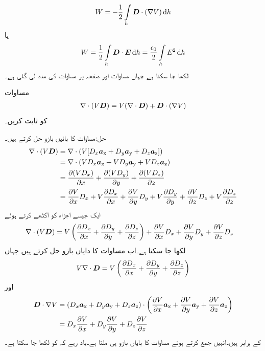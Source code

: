 \begin{align*}
W=-\frac{1}{2} \int \limits_h \kvec{D} \cdot (\nabla V) \dif h
\end{align*}
یا
\begin{align}\label{مساوات_توانائی_کثافت_توانائی_ب}
W=\frac{1}{2} \int \limits_h \kvec{D} \cdot \kvec{E} \dif h=\frac{\epsilon_0}{2}\int \limits_h  E^2 \dif h
\end{align}
لکھا جا سکتا ہے جہاں  مساوات  اور صفحہ  پر مساوات  کی مدد لی گئی ہے۔

مساوات 
\begin{align*}
\nabla \cdot  (V {{\boldsymbol{D}}})=V (\nabla \cdot {\ensuremath{{\boldsymbol{D}}}})+{{\boldsymbol{D}}} \cdot (\nabla V)
\end{align*}
 کو ثابت کریں۔

حل:مساوات  کا بائیں بازو حل کرتے ہیں۔
\begin{align*}
\nabla \cdot (V {{\boldsymbol{D}}})&=\nabla \cdot (V[D_x{\boldsymbol{a}}_{\textup{x}}+D_y{\boldsymbol{a}}_{\textup{y}}+D_z{\boldsymbol{a}}_{\textup{z}}])\\
&=\nabla \cdot (V D_x{\boldsymbol{a}}_{\textup{x}}+V D_y{\boldsymbol{a}}_{\textup{y}}+VD_z{\boldsymbol{a}}_{\textup{z}})\\
&=\frac{\partial (V D_x)}{\partial x}+\frac{\partial (V D_y)}{\partial y}+\frac{\partial (V D_z)}{\partial z}\\
&=\frac{\partial V}{\partial x} D_x +V\frac{\partial D_x}{\partial x}+\frac{\partial V}{\partial y} D_y +V\frac{\partial D_y}{\partial y}+\frac{\partial V}{\partial z} D_z +V\frac{\partial D_z}{\partial z}
\end{align*}
ایک جیسے اجزاء کو اکٹھے کرتے ہوئے
\begin{align*}
\nabla \cdot (V {{\boldsymbol{D}}})&=V\left(\frac{\partial D_x}{\partial x}+\frac{\partial D_y}{\partial y}+\frac{\partial D_z}{\partial z}\right)+\frac{\partial V}{\partial x} D_x +\frac{\partial V}{\partial y} D_y +\frac{\partial V}{\partial z} D_z 
\end{align*}
لکھا جا سکتا ہے۔اب مساوات  کا دایاں بازو حل کرتے ہیں جہاں 
\begin{align*}
V \nabla \cdot {\ensuremath{{\boldsymbol{D}}}}=V \left(\frac{\partial D_x}{\partial x}+\frac{\partial D_y}{\partial y}+\frac{\partial D_z}{\partial z} \right)
\end{align*}
اور
\begin{align*}
{\ensuremath{{\boldsymbol{D}}}} \cdot \nabla V&=(D_x{\boldsymbol{a}}_{\textup{x}}+D_y{\boldsymbol{a}}_{\textup{y}}+D_z{\boldsymbol{a}}_{\textup{z}}) \cdot \left(\frac{\partial V}{\partial x}{\boldsymbol{a}}_{\textup{x}} +\frac{\partial V}{\partial y}{\boldsymbol{a}}_{\textup{y}}+\frac{\partial V}{\partial z}{\boldsymbol{a}}_{\textup{z}}\right)\\
&= D_x\frac{\partial V}{\partial x} + D_y\frac{\partial V}{\partial y} +D_z\frac{\partial V}{\partial z}  
\end{align*}
کے برابر ہیں۔انہیں جمع کرتے ہوئے مساوات  کا بایاں بازو ہی ملتا ہے۔یاد رہے کہ  کو  لکھا جا سکتا  ہے۔

